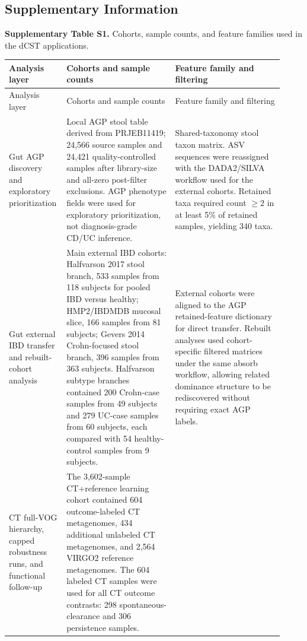 \begin{landscape}
\begingroup
\scriptsize
\setlength{\tabcolsep}{4pt}
\renewcommand{\arraystretch}{1.16}

\section*{Supplementary Information}

\noindent\textbf{Supplementary Table S1.} Cohorts, sample counts, and feature
families used in the dCST applications.

\begin{longtable}{p{0.16\linewidth}p{0.38\linewidth}p{0.38\linewidth}}
\toprule
Analysis layer & Cohorts and sample counts & Feature family and filtering \\
\midrule
\endfirsthead
\toprule
Analysis layer & Cohorts and sample counts & Feature family and filtering \\
\midrule
\endhead
\bottomrule
\endfoot
Gut AGP discovery and exploratory prioritization &
Local AGP stool table derived from PRJEB11419; 24,566 source samples and 24,421 quality-controlled samples after library-size and all-zero post-filter exclusions. AGP phenotype fields were used for exploratory prioritization, not diagnosis-grade CD/UC inference. &
Shared-taxonomy stool taxon matrix. ASV sequences were reassigned with the DADA2/SILVA workflow used for the external cohorts. Retained taxa required count \(\geq 2\) in at least 5\% of retained samples, yielding 340 taxa. \\
\midrule
Gut external IBD transfer and rebuilt-cohort analysis &
Main external IBD cohorts: Halfvarson 2017 stool branch, 533 samples from 118 subjects for pooled IBD versus healthy; HMP2/IBDMDB mucosal slice, 166 samples from 81 subjects; Gevers 2014 Crohn-focused stool branch, 396 samples from 363 subjects. Halfvarson subtype branches contained 200 Crohn-case samples from 49 subjects and 279 UC-case samples from 60 subjects, each compared with 54 healthy-control samples from 9 subjects. &
External cohorts were aligned to the AGP retained-feature dictionary for direct transfer. Rebuilt analyses used cohort-specific filtered matrices under the same absorb workflow, allowing related dominance structure to be rediscovered without requiring exact AGP labels. \\
\midrule
CT full-VOG hierarchy, capped robustness runs, and functional follow-up &
The 3,602-sample CT+reference learning cohort contained 604 outcome-labeled CT metagenomes, 434 additional unlabeled CT metagenomes, and 2,564 VIRGO2 reference metagenomes. The 604 labeled CT samples were used for all CT outcome contrasts: 298 spontaneous-clearance and 306 persistence samples. &

\end{longtable}
\end{landscape}
